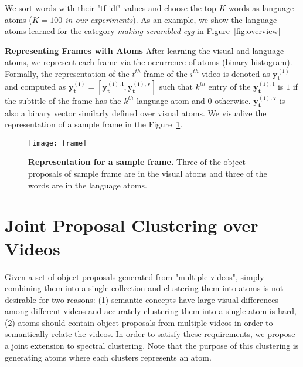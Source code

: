 We sort words with their "tf-idf" values and choose the top $K$ words as language atoms (\emph{$K=100$ in our experiments}). As an example, we show the language atoms learned for the category \emph{making scrambled egg} in Figure~\ref{fig:overview} %


\noindent\textbf{Representing Frames with Atoms}
After learning the visual and language atoms, we represent each frame via the occurrence of atoms (binary histogram). Formally, the representation of the $t^{th}$ frame of the $i^{th}$ video is denoted as $\mathbf{y^{(i)}_t}$ and computed as $\mathbf{y^{(i)}_t}=[\mathbf{y^{(i),l}_t},\mathbf{y^{(i),v}_t}]$ such that $k^{th}$ entry of the $\mathbf{y^{(i),l}_t}$ is $1$ if the subtitle of the frame has the $k^{th}$ language atom and $0$ otherwise. $\mathbf{y^{(i),v}_t}$ is also a binary vector similarly defined over visual atoms. We visualize the representation of a sample frame in the Figure~\ref{visFrame}.
\begin{figure}[h!]
  \texttt{[image: frame]}
  \caption{\textbf{Representation for a sample frame.} Three of the object proposals of sample frame are in the visual atoms and three of the words are in the language atoms.}
  \label{visFrame}
  \vspace{-3mm}
\end{figure}

\section{Joint Proposal Clustering over Videos}
\label{jointProp}
Given a set of object proposals generated from "multiple videos", simply combining them into a single collection and clustering them into atoms is not desirable for two reasons: (1) semantic concepts have large visual differences among different videos and accurately clustering them into a single atom is hard, (2) atoms should contain object proposals from multiple videos in order to semantically relate the videos. In order to satisfy these requirements, we propose a joint extension to spectral clustering. Note that the purpose of this clustering is generating atoms where each clusters represents an atom.

